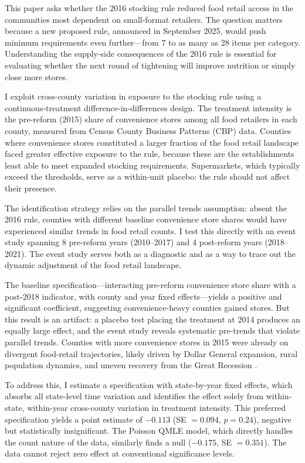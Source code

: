 \documentclass[12pt]{article}
\begin{document}
This paper asks whether the 2016 stocking rule reduced food retail access in the communities most dependent on small-format retailers. The question matters because a new proposed rule, announced in September 2025, would push minimum requirements even further---from 7 to as many as 28 items per category. Understanding the supply-side consequences of the 2016 rule is essential for evaluating whether the next round of tightening will improve nutrition or simply close more stores.

I exploit cross-county variation in exposure to the stocking rule using a continuous-treatment difference-in-differences design. The treatment intensity is the pre-reform (2015) share of convenience stores among all food retailers in each county, measured from Census County Business Patterns (CBP) data. Counties where convenience stores constituted a larger fraction of the food retail landscape faced greater effective exposure to the rule, because these are the establishments least able to meet expanded stocking requirements. Supermarkets, which typically exceed the thresholds, serve as a within-unit placebo: the rule should not affect their presence.

The identification strategy relies on the parallel trends assumption: absent the 2016 rule, counties with different baseline convenience store shares would have experienced similar trends in food retail counts. I test this directly with an event study spanning 8 pre-reform years (2010--2017) and 4 post-reform years (2018--2021). The event study serves both as a diagnostic and as a way to trace out the dynamic adjustment of the food retail landscape.

The baseline specification---interacting pre-reform convenience store share with a post-2018 indicator, with county and year fixed effects---yields a positive and significant coefficient, suggesting convenience-heavy counties gained stores. But this result is an artifact: a placebo test placing the treatment at 2014 produces an equally large effect, and the event study reveals systematic pre-trends that violate parallel trends. Counties with more convenience stores in 2015 were already on divergent food-retail trajectories, likely driven by Dollar General expansion, rural population dynamics, and uneven recovery from the Great Recession \citep{chen2016effect}.

To address this, I estimate a specification with state-by-year fixed effects, which absorbs all state-level time variation and identifies the effect solely from within-state, within-year cross-county variation in treatment intensity. This preferred specification yields a point estimate of $-0.113$ (SE $= 0.094$, $p = 0.24$), negative but statistically insignificant. The Poisson QMLE model, which directly handles the count nature of the data, similarly finds a null ($-0.175$, SE $= 0.351$). The data cannot reject zero effect at conventional significance levels.
\end{document}
